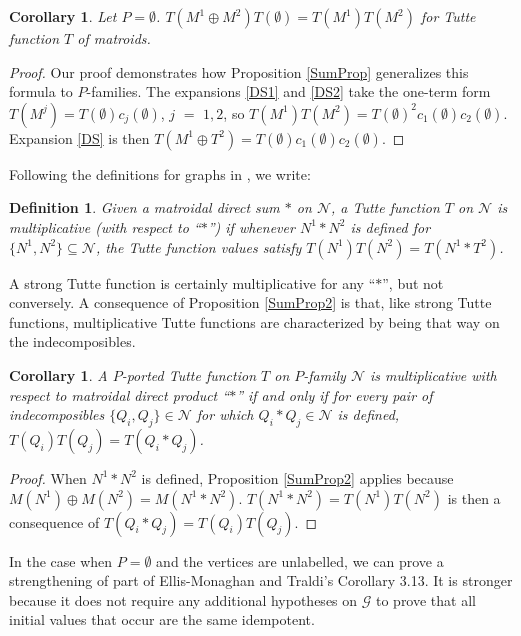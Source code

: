 \documentclass[12pt,leqno]{amsart}
\newtheorem{cor}[lem]{Corollary}
\newtheorem{definition}[lem]{Definition}
\theoremstyle{remark}
\begin{document}
\begin{cor}\cite{Ellis-Monaghan-Traldi}
Let $P=\emptyset$.
$T(M^1\oplus M^2)T(\emptyset) = T(M^1)T(M^2)$ for Tutte
function $T$ of matroids.
\end{cor}

\begin{proof}
Our proof demonstrates how Proposition \ref{SumProp}
generalizes this formula to $P$-families.
The expansions \ref{DS1} and \ref{DS2} take the one-term form
$T(M^j) = T(\emptyset) c_j(\emptyset)$, $j$ $=$ $1,2$,
so $T(M^1)T(M^2)=T(\emptyset)^2 c_1(\emptyset) c_2(\emptyset)$.
Expansion \ref{DS} is then
$T(M^1\oplus T^2)=T(\emptyset) c_1(\emptyset) c_2(\emptyset)$.
\end{proof}

Following the definitions for graphs in \cite{Ellis-Monaghan-Traldi}, we write:

\begin{definition}
Given a matroidal direct sum $*$ on $\mathcal{N}$, 
a Tutte function $T$ on $\mathcal{N}$ is
\emph{multiplicative} (with respect to ``$*$'')
if whenever $N^1*N^2$ is defined
for $\{N^1,N^2\}\subseteq \mathcal{N}$, the Tutte
function values satisfy 
$T(N^1)T(N^2)=T(N^1*T^2)$.
\end{definition}

A strong Tutte function is certainly multiplicative
for any ``$*$'', but not conversely.  A consequence
of Proposition \ref{SumProp2} is that,
like strong Tutte functions, multiplicative
Tutte functions are characterized by being that way
on the indecomposibles.  

\begin{cor}
A $P$-ported Tutte function $T$ on $P$-family $\mathcal{N}$ 
is multiplicative with respect to matroidal direct product
``$*$'' if and only if 
for every pair of indecomposibles $\{Q_i, Q_j\}\in\mathcal{N}$ for which 
$Q_i*Q_j\in\mathcal{N}$ is defined, $T(Q_i)T(Q_j)=T(Q_i*Q_j)$.
\end{cor}

\begin{proof} 
When $N^1*N^2$ is defined, Proposition \ref{SumProp2}
applies because $M(N^1)\oplus  M(N^2)=M(N^1*N^2)$.
$T(N^1*N^2)=T(N^1)T(N^2)$ is then a consequence
of $T(Q_i*Q_j)=T(Q_i)T(Q_j)$.
\end{proof}

In the case when $P=\emptyset$ and the vertices are unlabelled,
we can prove a strengthening of part of Ellis-Monaghan and Traldi's
Corollary 3.13.  It is stronger because it does not require 
any additional hypotheses on $\mathcal{G}$ to prove that all
initial values that occur are the same idempotent.
\end{document}
